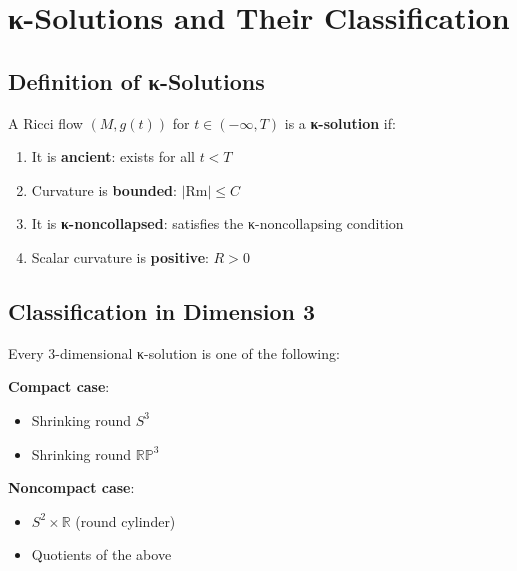 \chapter{κ-Solutions and Their Classification}
\label{chap:kappa_solutions}

\section{Definition of κ-Solutions}

\begin{definition}[κ-Solution]
\label{def:kappa_solution}
\leanok
{}
A Ricci flow $(M, g(t))$ for $t \in (-\infty, T)$ is a \textbf{κ-solution} if:
\begin{enumerate}
\item It is \textbf{ancient}: exists for all $t < T$
\item Curvature is \textbf{bounded}: $|\text{Rm}| \leq C$ 
\item It is \textbf{κ-noncollapsed}: satisfies the κ-noncollapsing condition
\item Scalar curvature is \textbf{positive}: $R > 0$
\end{enumerate}
\end{definition}

\section{Classification in Dimension 3}

\begin{theorem}
\label{thm:kappa_classification}
\leanok
{}
Every 3-dimensional κ-solution is one of the following:

\textbf{Compact case}:
\begin{itemize}
\item Shrinking round $S^3$
\item Shrinking round $\mathbb{RP}^3$
\end{itemize}

\textbf{Noncompact case}:
\begin{itemize}
\item $S^2 \times \mathbb{R}$ (round cylinder)
\item Quotients of the above
\end{itemize}
\end{theorem}

